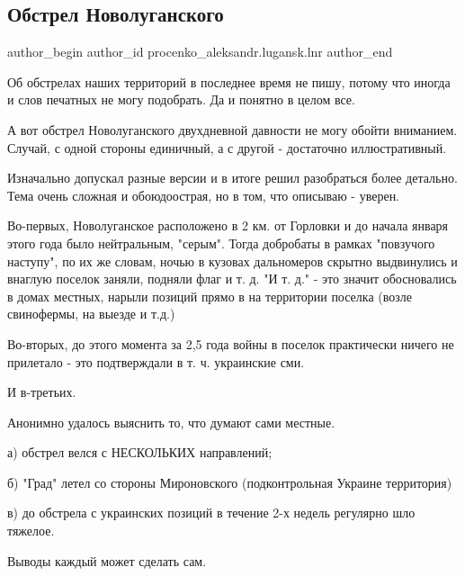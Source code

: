  
 
 
 
 
 
\subsection{Обстрел Новолуганского}
\label{sec:20_12_2017.fb.procenko_aleksandr.lugansk.lnr.1.obstrel_novoluganskoje}
 
\ifcmt
 author_begin
   author_id procenko_aleksandr.lugansk.lnr
 author_end
\fi

Об обстрелах наших территорий в последнее время не пишу, потому что иногда и
слов печатных не могу подобрать. Да и понятно в целом все.

А вот обстрел Новолуганского двухдневной давности не могу обойти вниманием.
Случай, с одной стороны единичный, а с другой - достаточно иллюстративный.

Изначально допускал разные версии и в итоге решил разобраться более детально.
Тема очень сложная и обоюдоострая, но в том, что описываю - уверен. 

Во-первых, Новолуганское расположено в 2 км. от Горловки и до начала января
этого года было нейтральным, "серым". Тогда добробаты в рамках "повзучого
наступу", по их же словам, ночью в кузовах дальномеров скрытно выдвинулись и
внаглую поселок заняли, подняли флаг и т. д. "И т. д." - это значит
обосновались в домах местных, нарыли позиций прямо в на территории поселка
(возле свинофермы, на выезде и т.д.) 

Во-вторых, до этого момента за 2,5 года войны в поселок практически ничего не
прилетало - это подтверждали в т. ч. украинские сми.

И в-третьих. 

Анонимно удалось выяснить то, что думают сами местные.

а) обстрел велся с НЕСКОЛЬКИХ направлений;

б) "Град" летел со стороны Мироновского (подконтрольная Украине территория)

в) до обстрела с украинских позиций в течение 2-х недель регулярно шло тяжелое.

Выводы каждый может сделать сам.
